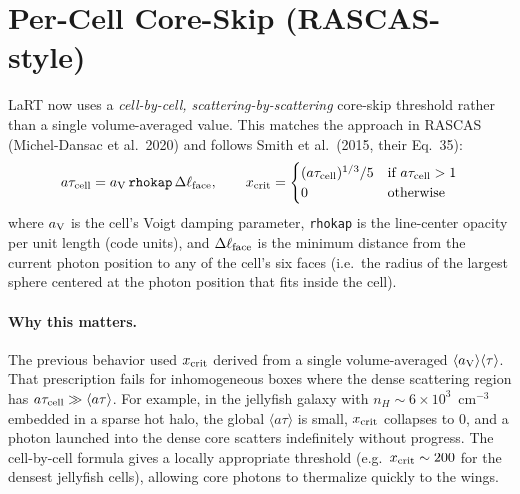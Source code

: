 \documentclass[english,a4paper]{my_memo}
\begin{document}
\section{Per-Cell Core-Skip (RASCAS-style)}

LaRT now uses a \emph{cell-by-cell, scattering-by-scattering} core-skip threshold rather
than a single volume-averaged value.  This matches the approach in RASCAS
(Michel-Dansac et al.\ 2020) and follows Smith et al.\ (2015, their
Eq.~35):
\[
   a\tau_{\rm cell} = a_{\rm V}\,\mathtt{rhokap}\,\Delta\ell_{\rm face},
   \qquad
   x_{\rm crit} = \begin{cases}
     (a\tau_{\rm cell})^{1/3}/5 & \text{if } a\tau_{\rm cell} > 1 \\
     0 & \text{otherwise}
   \end{cases}
\]
where $a_{\rm V}$ is the cell's Voigt damping parameter, \texttt{rhokap}
is the line-center opacity per unit length (code units), and
$\Delta\ell_{\rm face}$ is the minimum distance from the current photon
position to any of the cell's six faces (i.e.\ the radius of the largest
sphere centered at the photon position that fits inside the cell).

\paragraph{Why this matters.}
The previous behavior used $x_{\rm crit}$ derived from a single
volume-averaged $\langle a_{\rm V}\rangle\langle\tau\rangle$.  That
prescription fails for inhomogeneous boxes where the dense scattering
region has $a\tau_{\rm cell}\gg \langle a\tau\rangle$.  For example, in
the jellyfish galaxy with $n_H\sim 6\times 10^3$~cm$^{-3}$ embedded in a
sparse hot halo, the global $\langle a\tau\rangle$ is small,
$x_{\rm crit}$ collapses to $0$, and a photon launched into the dense
core scatters indefinitely without progress.  The cell-by-cell formula gives
a locally appropriate threshold (e.g.\ $x_{\rm crit}\sim 200$ for the
densest jellyfish cells), allowing core photons to thermalize quickly to
the wings.
\end{document}
